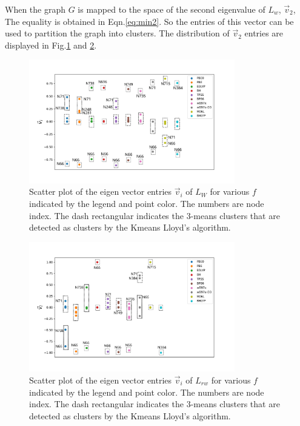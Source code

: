 \documentclass[letterpaper,12pt]{article}
\begin{document}
When the graph $G$ is mapped to the space of the second eigenvalue of $L_w$, $\vec{v}_2$,
The equality is obtained in Eqn.\ref{eq:min2}. So the entries of this vector can be used to partition the graph into clusters. The distribution of $\vec{v}_2$ entries are displayed in Fig.\ref{fig:2ndVecLW} and \ref{fig:2ndVecRW}.

\begin{figure}
    \centering
    \includegraphics[width=0.8\textwidth]{figs/fig_2ndVecLw.png}
    \caption{Scatter plot of the eigen vector entries $\Vec{v}_i$ of $L_W$ for various $f$ indicated by the legend and point color. 
    The numbers are node index. The dash rectangular indicates the 3-means clusters that are detected as clusters by the Kmeans Lloyd's algorithm. }
    \label{fig:2ndVecLW}
\end{figure}

\begin{figure}
    \centering
    \includegraphics[width=0.8\textwidth]{figs/fig_2ndVecRW.png}
    \caption{Scatter plot of the eigen vector entries $\Vec{v}_i$ of $L_{rw}$ for various $f$ indicated by the legend and point color. 
    The numbers are node index. The dash rectangular indicates the 3-means clusters that are detected as clusters by the Kmeans Lloyd's algorithm.  }
    \label{fig:2ndVecRW}
\end{figure}
\end{document}
